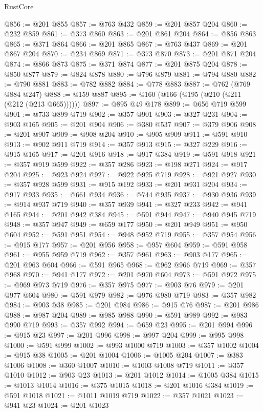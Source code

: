 \begin{lexlean}{RustCore}
\begin{coremodule}
@856 := @201 @855
@857 := @763 @432
@859 := @201 @857 @204
@860 := @232 @859
@861 := @373 @860
@863 := @201 @861 @204
@864 := @856 @863
@865 := @371 @864
@866 := @201 @865
@867 := @763 @437
@869 := @201 @867 @204
@870 := @234 @869
@871 := @373 @870
@873 := @201 @871 @204
@874 := @866 @873
@875 := @371 @874
@877 := @201 @875 @204
@878 := @850 @877
@879 := @824 @878
@880 := @796 @879
@881 := @794 @880
@882 := @790 @881
@883 := @782 @882
@884 := @778 @883
@887 := @762 (@769 @884 @247)
@888 := @159 @887
@895 := @160 (@166 (@195 (@210 (@211 (@212 (@213 @665))))))
@897 := @895 @49 @178
@899 := @656 @719 @599
@901 := @733 @899 @719
@902 := @357 @901
@903 := @327 @231
@904 := @903 @165
@905 := @201 @904
@906 := @380 @537
@907 := @379 @906
@908 := @201 @907
@909 := @908 @204
@910 := @905 @909
@911 := @591 @910
@913 := @902 @911 @719
@914 := @357 @913
@915 := @327 @229
@916 := @915 @165
@917 := @201 @916
@918 := @917 @384
@919 := @591 @918
@921 := @357 @919 @599
@922 := @357 @286
@923 := @198 @271
@924 := @917 @204
@925 := @923 @924
@927 := @922 @925 @719
@928 := @921 @927
@930 := @357 @928 @599
@931 := @915 @192
@933 := @201 @931 @204
@934 := @917 @933
@935 := @661 @934
@936 := @744 @935
@937 := @930 @936
@939 := @914 @937 @719
@940 := @357 @939
@941 := @327 @233
@942 := @941 @165
@944 := @201 @942 @384
@945 := @591 @944
@947 := @940 @945 @719
@948 := @357 @947
@949 := @659 @177
@950 := @201 @949
@951 := @950 @604
@952 := @591 @951
@954 := @948 @952 @719
@955 := @357 @954
@956 := @915 @177
@957 := @201 @956
@958 := @957 @604
@959 := @591 @958
@961 := @955 @959 @719
@962 := @357 @961
@963 := @903 @177
@965 := @201 @963 @604
@966 := @591 @965
@968 := @962 @966 @719
@969 := @357 @968
@970 := @941 @177
@972 := @201 @970 @604
@973 := @591 @972
@975 := @969 @973 @719
@976 := @357 @975
@977 := @903 @76
@979 := @201 @977 @604
@980 := @591 @979
@982 := @976 @980 @719
@983 := @357 @982
@984 := @903 @38
@985 := @201 @984
@986 := @915 @76
@987 := @201 @986
@988 := @987 @204
@989 := @985 @988
@990 := @591 @989
@992 := @983 @990 @719
@993 := @357 @992
@994 := @659 @23
@995 := @201 @994
@996 := @915 @23
@997 := @201 @996
@998 := @997 @204
@999 := @995 @998
@1000 := @591 @999
@1002 := @993 @1000 @719
@1003 := @357 @1002
@1004 := @915 @38
@1005 := @201 @1004
@1006 := @1005 @204
@1007 := @383 @1006
@1008 := @360 @1007
@1010 := @1003 @1008 @719
@1011 := @357 @1010
@1012 := @903 @23
@1013 := @201 @1012
@1014 := @1005 @384
@1015 := @1013 @1014
@1016 := @375 @1015
@1018 := @201 @1016 @384
@1019 := @591 @1018
@1021 := @1011 @1019 @719
@1022 := @357 @1021
@1023 := @941 @23
@1024 := @201 @1023

\end{coremodule}
\end{lexlean}

